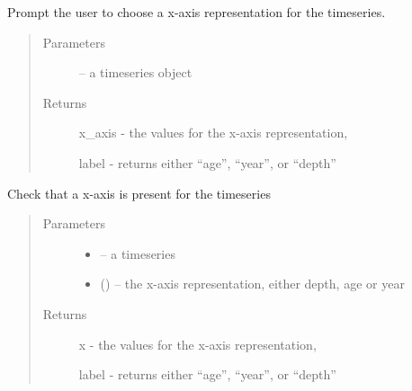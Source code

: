 \documentclass[letterpaper,10pt,english]{sphinxmanual}
\begin{document}
\begin{fulllineitems}
\label{\detokenize{LipdUtils:pyleoclim.LipdUtils.xAxisTs}}
Prompt the user to choose a x-axis representation for the timeseries.
\begin{quote}\begin{description}
\item[{Parameters}] \leavevmode
{} -- a timeseries object

\item[{Returns}] \leavevmode

x\_axis - the values for the x-axis representation,

label - returns either ``age'', ``year'', or ``depth''


\end{description}\end{quote}

\end{fulllineitems}


\begin{fulllineitems}
\label{\detokenize{LipdUtils:pyleoclim.LipdUtils.checkXaxis}}
Check that a x-axis is present for the timeseries
\begin{quote}\begin{description}
\item[{Parameters}] \leavevmode\begin{itemize}
\item {} 
 -- a timeseries

\item {} 
 () -- the x-axis representation, either depth, age or year

\end{itemize}

\item[{Returns}] \leavevmode

x - the values for the x-axis representation,

label - returns either ``age'', ``year'', or ``depth''


\end{description}\end{quote}

\end{fulllineitems}
\end{document}
